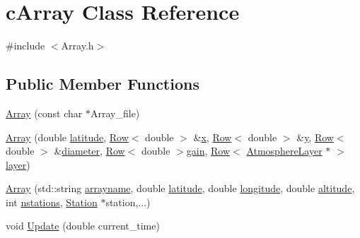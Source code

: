 \hypertarget{classcArray}{
\section{cArray Class Reference}
\label{classcArray}
}


{\ttfamily \#include $<$Array.h$>$}

\subsection*{Public Member Functions}
\begin{DoxyCompactItemize}
\item 
\hyperlink{classcArray_a549be680a7c2a2ff261a5e3e3b57e839}{Array} (const char $\ast$Array\_\-file)
\item 
\hyperlink{classcArray_a2178b02ce3799a716d7fdf245439d4b1}{Array} (double \hyperlink{classcArray_a9508d1287d4349f6e5aa37a903512237}{latitude}, \hyperlink{classRow}{Row}$<$ double $>$ \&\hyperlink{classcArray_a7479fa16d4d43f5c8d70e402ae99f198}{x}, \hyperlink{classRow}{Row}$<$ double $>$ \&\hyperlink{classcArray_aae5f928d97c8cdd9172a4dbca0e84a73}{y}, \hyperlink{classRow}{Row}$<$ double $>$ \&\hyperlink{classcArray_a80f01dfdf1b0acdef41d79ce888ae12c}{diameter}, \hyperlink{classRow}{Row}$<$ double $>$\hyperlink{classcArray_a2a642c899d67cfeb5dc87d4e5adf0f3f}{gain}, \hyperlink{classRow}{Row}$<$ \hyperlink{classAtmosphereLayer}{AtmosphereLayer} $\ast$ $>$\hyperlink{classcArray_a78170c7d575b10616a74a84c6a6ebe70}{layer})
\item 
\hyperlink{classcArray_a8353005225736b072bb5be04afc8c6b9}{Array} (std::string \hyperlink{classcArray_a06fe8c046d4fbc0683787ab848d481fd}{arrayname}, double \hyperlink{classcArray_a9508d1287d4349f6e5aa37a903512237}{latitude}, double \hyperlink{classcArray_a216223dbb53b67e9035279018ce1d599}{longitude}, double \hyperlink{classcArray_a463ca1e9dcdf170d0e58bd937fdf2369}{altitude}, int \hyperlink{classcArray_ab9cbddaf61761740b3e29d2e4a9f51be}{nstations}, \hyperlink{classStation}{Station} $\ast$station,...)
\item 
void \hyperlink{classcArray_afa7a4038ae07a8d887772125a84e77a8}{Update} (double current\_\-time)
\end{DoxyCompactItemize}

